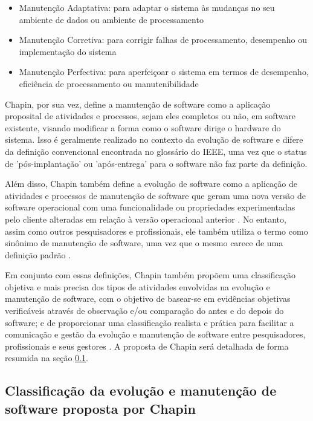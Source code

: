 \begin{itemize}
    \item Manutenção Adaptativa: para adaptar o sistema às mudanças no seu ambiente de dados ou ambiente de processamento
    \item Manutenção Corretiva: para corrigir falhas de processamento, desempenho ou implementação do sistema
    \item Manutenção Perfectiva: para aperfeiçoar o sistema em termos de desempenho, eficiência de processamento ou manutenibilidade
\end{itemize}

Chapin, por sua vez, define a manutenção de software como a aplicação proposital de atividades e 
processos, sejam eles completos ou não, em software existente, visando modificar a forma como o 
software dirige o hardware do sistema. Isso é geralmente realizado no contexto da evolução de software 
e difere da definição convencional encontrada no glossário do IEEE, uma vez que o status de 
'pós-implantação' ou 'após-entrega' para o software não faz parte da definição. 

Além disso, Chapin também define a evolução de software como a aplicação de atividades e 
processos de manutenção de software que geram uma nova versão de software operacional com uma funcionalidade 
ou propriedades experimentadas pelo cliente alteradas em relação à versão operacional anterior \cite{chapin2001types}. 
No entanto, assim como outros pesquisadores e profissionais, ele também utiliza o termo como sinônimo 
de manutenção de software, uma vez que o mesmo carece de uma definição padrão \cite{bennett2000software,chapin2001types}.

Em conjunto com essas definições, Chapin também propõem uma classificação objetiva e mais precisa dos 
tipos de atividades envolvidas na evolução e manutenção de software, com o objetivo de basear-se em 
evidências objetivas verificáveis através de observação e/ou comparação do antes e do depois do software; 
e de proporcionar uma classificação realista e prática para facilitar a comunicação e gestão da evolução 
e manutenção de software entre pesquisadores, profissionais e seus gestores \cite{chapin2001types}. 
A proposta de Chapin será detalhada de forma resumida na seção \ref{section:chapinTypes}.

\subsection{Classificação da evolução e manutenção de software proposta por Chapin}
\label{section:chapinTypes}

